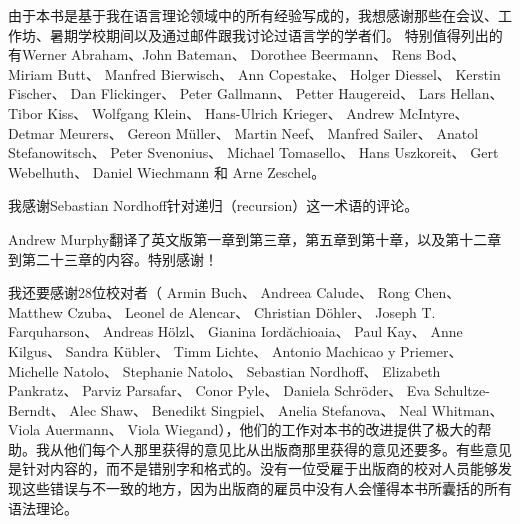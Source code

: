 由于本书是基于我在语言理论领域中的所有经验写成的，我想感谢那些在会议、工作坊、暑期学校期间以及通过邮件跟我讨论过语言学的学者们。
特别值得列出的有Werner Abraham、John Bateman、
Dorothee Beermann、
Rens Bod、
Miriam Butt、
Manfred Bierwisch、
Ann Copestake、
Holger Diessel、
Kerstin Fischer、
Dan Flickinger、
Peter Gallmann、
Petter Haugereid、
Lars Hellan、
Tibor Kiss、
Wolfgang Klein、 
Hans-Ulrich Krieger、
Andrew McIntyre、
Detmar Meurers、
Gereon Müller、
Martin Neef、
Manfred Sailer、 
Anatol Stefanowitsch、
Peter Svenonius、
Michael Tomasello、 
Hans Uszkoreit、
Gert Webelhuth、
Daniel Wiechmann 
和
Arne Zeschel。

我感谢Sebastian Nordhoff针对递归（recursion）这一术语的评论。

Andrew Murphy翻译了英文版第一章到第三章，第五章到第十章，以及第十二章到第二十三章的内容。特别感谢！

我还要感谢28位校对者（
Armin Buch、 
Andreea Calude、
Rong Chen、
Matthew Czuba、
Leonel de Alencar、 
Christian Döhler、
Joseph T. Farquharson、
Andreas Hölzl、 
Gianina Iordăchioaia、 
Paul Kay、 
Anne Kilgus、 
Sandra Kübler、
Timm Lichte、 
Antonio Machicao y Priemer、
Michelle Natolo、
Stephanie Natolo、
Sebastian Nordhoff、
Elizabeth Pankratz、
Parviz Parsafar、 
Conor Pyle、
Daniela Schröder、
Eva Schultze-Berndt、
Alec Shaw、
Benedikt Singpiel、 
Anelia Stefanova、
Neal Whitman、
Viola Auermann、
Viola Wiegand），他们的工作对本书的改进提供了极大的帮助。我从他们每个人那里获得的意见比从出版商那里获得的意见还要多。有些意见是针对内容的，而不是错别字和格式的。没有一位受雇于出版商的校对人员能够发现这些错误与不一致的地方，因为出版商的雇员中没有人会懂得本书所囊括的所有语法理论。

